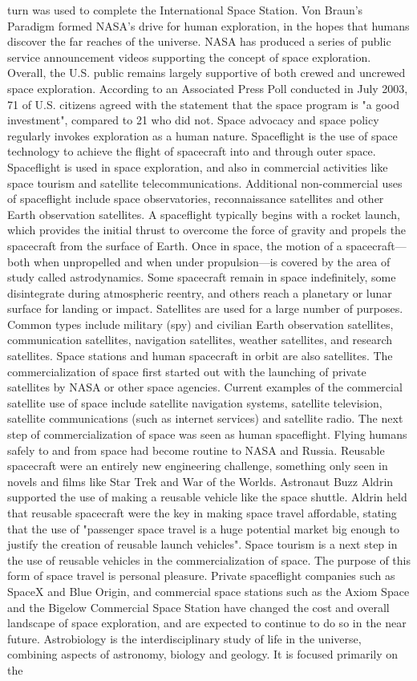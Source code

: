 \documentclass[12pt]{article}
\begin{document}
turn was used to complete the International Space Station. Von Braun's Paradigm formed NASA's drive for human exploration, in the hopes that humans discover the far reaches of the universe. NASA has produced a series of public service announcement videos supporting the concept of space exploration. Overall, the U.S. public remains largely supportive of both crewed and uncrewed space exploration. According to an Associated Press Poll conducted in July 2003, 71 of U.S. citizens agreed with the statement that the space program is "a good investment", compared to 21 who did not. Space advocacy and space policy regularly invokes exploration as a human nature. Spaceflight is the use of space technology to achieve the flight of spacecraft into and through outer space. Spaceflight is used in space exploration, and also in commercial activities like space tourism and satellite telecommunications. Additional non-commercial uses of spaceflight include space observatories, reconnaissance satellites and other Earth observation satellites. A spaceflight typically begins with a rocket launch, which provides the initial thrust to overcome the force of gravity and propels the spacecraft from the surface of Earth. Once in space, the motion of a spacecraft—both when unpropelled and when under propulsion—is covered by the area of study called astrodynamics. Some spacecraft remain in space indefinitely, some disintegrate during atmospheric reentry, and others reach a planetary or lunar surface for landing or impact. Satellites are used for a large number of purposes. Common types include military (spy) and civilian Earth observation satellites, communication satellites, navigation satellites, weather satellites, and research satellites. Space stations and human spacecraft in orbit are also satellites. The commercialization of space first started out with the launching of private satellites by NASA or other space agencies. Current examples of the commercial satellite use of space include satellite navigation systems, satellite television, satellite communications (such as internet services) and satellite radio. The next step of commercialization of space was seen as human spaceflight. Flying humans safely to and from space had become routine to NASA and Russia. Reusable spacecraft were an entirely new engineering challenge, something only seen in novels and films like Star Trek and War of the Worlds. Astronaut Buzz Aldrin supported the use of making a reusable vehicle like the space shuttle. Aldrin held that reusable spacecraft were the key in making space travel affordable, stating that the use of "passenger space travel is a huge potential market big enough to justify the creation of reusable launch vehicles". Space tourism is a next step in the use of reusable vehicles in the commercialization of space. The purpose of this form of space travel is personal pleasure. Private spaceflight companies such as SpaceX and Blue Origin, and commercial space stations such as the Axiom Space and the Bigelow Commercial Space Station have changed the cost and overall landscape of space exploration, and are expected to continue to do so in the near future. Astrobiology is the interdisciplinary study of life in the universe, combining aspects of astronomy, biology and geology. It is focused primarily on the 
\end{document}
